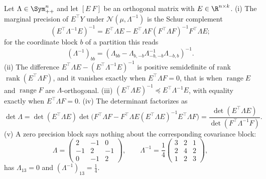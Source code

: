 Let \(\Lambda\in\Sym_{++}^n\) and let \([E\ F]\) be an orthogonal matrix with
\(E\in\R^{n\times k}\). (i) The marginal precision of \(E^\top Y\) under
\(\mathcal N(\mu,\Lambda^{-1})\) is the Schur complement
\begin{equation}
\left(E^\top\Lambda^{-1}E\right)^{-1}
=E^\top\Lambda E-E^\top\Lambda F\left(F^\top\Lambda F\right)^{-1}F^\top\Lambda E;
\end{equation}
for the coordinate block \(b\) of a partition this reads
\begin{equation}
\left(\Lambda^{-1}\right)_{bb}
=\left(\Lambda_{bb}-\Lambda_{b,-b}\Lambda_{-b,-b}^{-1}\Lambda_{-b,b}\right)^{-1}.
\label{eq:gauss-marginal-block}
\end{equation}
(ii) The difference \(E^\top\Lambda E-(E^\top\Lambda^{-1}E)^{-1}\) is positive
semidefinite of rank \(\operatorname{rank}(E^\top\Lambda F)\), and it vanishes
exactly when \(E^\top\Lambda F=0\), that is when \(\operatorname{range}E\) and
\(\operatorname{range}F\) are \(\Lambda\)-orthogonal. (iii)
\((E^\top\Lambda E)^{-1}\preceq E^\top\Lambda^{-1}E\), with equality exactly when
\(E^\top\Lambda F=0\). (iv) The determinant factorizes as
\[
\det\Lambda=\det(E^\top\Lambda E)\det\bigl(F^\top\Lambda F-F^\top\Lambda E(E^\top\Lambda E)^{-1}E^\top\Lambda F\bigr)
=\frac{\det(E^\top\Lambda E)}{\det(F^\top\Lambda^{-1}F)}.
\]
(v) A zero precision block says nothing about the corresponding covariance
block:
\begin{equation}
\Lambda=\begin{pmatrix}2&-1&0\\-1&2&-1\\0&-1&2\end{pmatrix},
\qquad
\Lambda^{-1}=\frac14\begin{pmatrix}3&2&1\\2&4&2\\1&2&3\end{pmatrix},
\label{eq:gauss-precision-not-covariance}
\end{equation}
has \(\Lambda_{13}=0\) and \((\Lambda^{-1})_{13}=\tfrac14\). 

